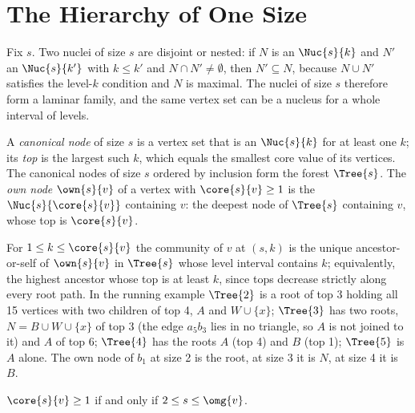 \section{The Hierarchy of One Size}\label{sec:hierarchy}

Fix $s$.
Two nuclei of size $s$ are disjoint or nested: if $N$ is an $\Nuc{s}{k}$ and $N'$ an $\Nuc{s}{k'}$ with $k\le k'$ and $N\cap N'\ne\emptyset$, then $N'\subseteq N$, because $N\cup N'$ satisfies the level-$k$ condition and $N$ is maximal.
The nuclei of size $s$ therefore form a laminar family, and the same vertex set can be a nucleus for a whole interval of levels.

\begin{definition}\label{def:node}
A \emph{canonical node} of size $s$ is a vertex set that is an $\Nuc{s}{k}$ for at least one $k$; its \emph{top} is the largest such $k$, which equals the smallest core value of its vertices.
The canonical nodes of size $s$ ordered by inclusion form the forest $\Tree{s}$.
The \emph{own node} $\own{s}{v}$ of a vertex with $\core{s}{v}\ge1$ is the $\Nuc{s}{\core{s}{v}}$ containing $v$: the deepest node of $\Tree{s}$ containing $v$, whose top is $\core{s}{v}$.
\end{definition}

For $1\le k\le\core{s}{v}$ the community of $v$ at $(s,k)$ is the unique ancestor-or-self of $\own{s}{v}$ in $\Tree{s}$ whose level interval contains $k$; equivalently, the highest ancestor whose top is at least $k$, since tops decrease strictly along every root path.
In the running example $\Tree{2}$ is a root of top 3 holding all 15 vertices with two children of top 4, $A$ and $W\cup\{x\}$; $\Tree{3}$ has two roots, $N=B\cup W\cup\{x\}$ of top 3 (the edge $a_5b_3$ lies in no triangle, so $A$ is not joined to it) and $A$ of top 6; $\Tree{4}$ has the roots $A$ (top 4) and $B$ (top 1); $\Tree{5}$ is $A$ alone.
The own node of $b_1$ at size 2 is the root, at size 3 it is $N$, at size 4 it is $B$.

\begin{fact}\label{fact:nesting}
$\core{s}{v}\ge1$ if and only if $2\le s\le\omg{v}$.
\end{fact}

